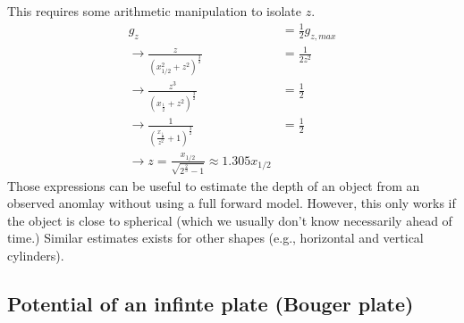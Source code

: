 \documentclass[a4paper,12pt]{article}
\begin{document}
\begin{tcolorbox}[enhanced jigsaw,breakable,pad at break*=1mm,
    colback=blue!5!white,colframe=babyblueeyes,title=Solutions]
This requires some arithmetic manipulation to isolate $z$.
\begin{eqnarray*}
g_z &=\frac{1}{2}g_{z,max} \\
\rightarrow \frac{z}{(x^2_{1/2}+z^2)^\frac{3}{2}} &= \frac{1}{2z^2}\\
\rightarrow \frac{z^3}{(x_{\frac{1}{2}}+z^2)^\frac{3}{2}}&= \frac{1}{2}\\
\rightarrow \frac{1}{(\frac{x_{\frac{1}{2}}}{z^2}+1)^\frac{3}{2}}&= \frac{1}{2}\\
\rightarrow z = \frac{x_{1/2}}{\sqrt{2^{\frac{2}{3}}-1}}\approx 1.305 x_{1/2}
\end{eqnarray*}
Those expressions can be useful to estimate the depth of an object from an observed anomlay without using a full forward model. However, this only works if the object is close to spherical (which we usually don't know necessarily ahead of time.) Similar estimates exists for other shapes (e.g., horizontal and vertical cylinders).
\end{tcolorbox}
\fi
\pagebreak
\subsection{Potential of an infinte plate (Bouger plate)}
\pagebreak
\end{document}
